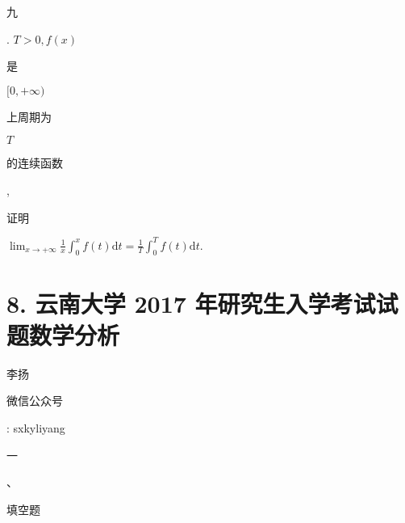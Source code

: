 \documentclass[10pt]{article}
\begin{document}
\begin{CJK}{UTF8}{mj}九\end{CJK}. $T>0, f(x)$ \begin{CJK}{UTF8}{mj}是\end{CJK} $[0,+\infty)$ \begin{CJK}{UTF8}{mj}上周期为\end{CJK} $T$ \begin{CJK}{UTF8}{mj}的连续函数\end{CJK}, \begin{CJK}{UTF8}{mj}证明\end{CJK} $\lim _{x \rightarrow+\infty} \frac{1}{x} \int_{0}^{x} f(t) \mathrm{d} t=\frac{1}{T} \int_{0}^{T} f(t) \mathrm{d} t$.

\section{8. 云南大学 2017 年研究生入学考试试题数学分析}
\begin{CJK}{UTF8}{mj}李扬\end{CJK}

\begin{CJK}{UTF8}{mj}微信公众号\end{CJK}: sxkyliyang

\begin{CJK}{UTF8}{mj}一\end{CJK}、\begin{CJK}{UTF8}{mj}填空题\end{CJK}
\end{document}
